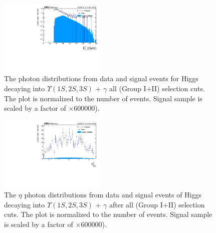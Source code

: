 \begin{figure}[!htbp]
\begin{center}
\includegraphics[width=0.45\textwidth]{figures_and_tables/outputPlots/HtoUpsilon_Cat0_ZZZZZ/nEvts/data_x_mc/withKinCuts/h_withKin_Photon_pt}\hspace*{1.cm}
\end{center}\vspace*{-.5cm}
\caption{The \PT photon distributions from data and signal events for Higgs decaying into $\Upsilon(1S,2S,3S)$ + $\gamma$ all (Group I+II) selection cuts. The plot is normalized to the number of events. Signal sample is scaled by a factor of $\times 600000$).}
\label{fig:pTPhoton_HtoUpsilon_Cat0_groupI_plus_II}
\end{figure}


\begin{figure}[!htbp]
\begin{center}
\includegraphics[width=0.45\textwidth]{figures_and_tables/outputPlots/HtoUpsilon_Cat0_ZZZZZ/nEvts/data_x_mc/withKinCuts/h_withKin_Photon_eta}\hspace*{1.cm}
\end{center}\vspace*{-.5cm}
\caption{The $\eta$ photon distributions from data and signal events of Higgs decaying into $\Upsilon(1S,2S,3S)$ + $\gamma$ after all (Group I+II) selection cuts. The plot is normalized to the number of events. Signal sample is scaled by a factor of $\times 600000$).}
\label{fig:etaPhoton_HtoUpsilon_Cat0_groupI_plus_II}
\end{figure}

